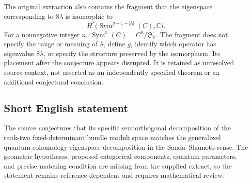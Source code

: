 \documentclass[11pt]{article}
\newcommand{\C}{\mathbb{C}}
\begin{document}
The original extraction also contains the fragment that the eigenspace corresponding to \(8\lambda\) is isomorphic to
\[
H^*\bigl(\operatorname{Sym}^{g-1-|\lambda|}(C),\C\bigr).
\]
For a nonnegative integer \(n\), \(\operatorname{Sym}^n(C)=C^n/\mathfrak S_n\). The fragment does not specify the range or meaning of \(\lambda\), define \(g\), identify which operator has eigenvalue \(8\lambda\), or specify the structure preserved by the isomorphism. Its placement after the conjecture appears disrupted. It is retained as unresolved source context, not asserted as an independently specified theorem or an additional conjectural conclusion.
\subsection{Short English statement}
The source conjectures that its specific semiorthogonal decomposition of the rank-two fixed-determinant bundle moduli space matches the generalized quantum-cohomology eigenspace decomposition in the Sanda--Shamoto sense. The geometric hypotheses, proposed categorical components, quantum parameters, and precise matching condition are missing from the supplied extract, so the statement remains reference-dependent and requires mathematical review.
\end{document}
